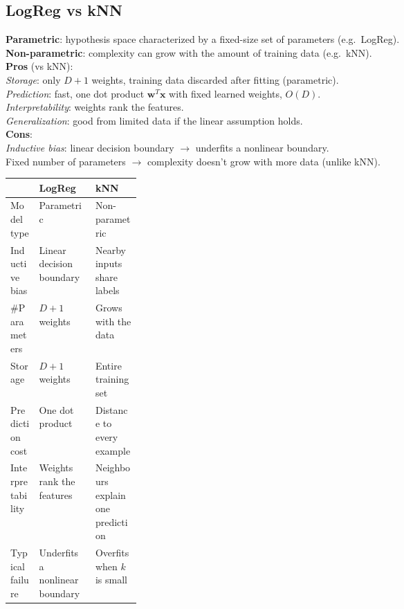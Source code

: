 \documentclass[10pt]{article}
\newcommand{\vx}{\mathbf{x}}
\newcommand{\vw}{\mathbf{w}}
\newcommand{\sub}[1]{\textit{#1}:}  %
\begin{document}
\begin{multicols*}{3}
\subsection{LogReg vs kNN}
\textbf{Parametric}: hypothesis space characterized by a fixed-size set of parameters (e.g.\ LogReg).\\
\textbf{Non-parametric}: complexity can grow with the amount of training data (e.g.\ kNN).\\
\textbf{Pros} (vs kNN):\\
\sub{Storage} only $D\!+\!1$ weights, training data discarded after fitting (parametric).\\
\sub{Prediction} fast, one dot product $\vw^T\vx$ with fixed learned weights, $O(D)$.\\
\sub{Interpretability} weights rank the features.\\
\sub{Generalization} good from limited data if the linear assumption holds.\\
\textbf{Cons}:\\
\sub{Inductive bias} linear decision boundary $\to$ underfits a nonlinear boundary.\\
Fixed number of parameters $\to$ complexity doesn't grow with more data (unlike kNN).\\
{\fontsize{4}{4.7}\selectfont\setlength{\tabcolsep}{3pt}\renewcommand{\arraystretch}{0.95}%
\begin{tabularx}{\linewidth}{@{}>{\raggedright\arraybackslash}p{0.22\linewidth}>{\raggedright\arraybackslash}X>{\raggedright\arraybackslash}X@{}}
 & \textbf{LogReg} & \textbf{kNN}\\\hline
Model type & Parametric & Non-parametric\\
Inductive bias & Linear decision boundary & Nearby inputs share labels\\
\#Parameters & $D\!+\!1$ weights & Grows with the data\\
Storage & $D\!+\!1$ weights & Entire training set\\
Prediction cost & One dot product & Distance to every example\\
Interpretability & Weights rank the features & Neighbours explain one prediction\\
Typical failure & Underfits a nonlinear boundary & Overfits when $k$ is small
\end{tabularx}}\\[2pt]


\end{multicols*}
\end{document}
